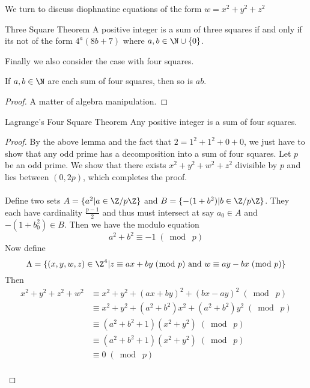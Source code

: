 We turn to discuss diophnatine equations of the form $w=x^2+y^2+z^2$

\begin{thm}{Three Square Theorem}{} A positive integer is a sum of three squares if and only if its not of the form $4^a(8b+7)$ where $a,b\in\N\cup\{0\}$. 
\end{thm}

Finally we also consider the case with four squares. 

\begin{lmm}{}{} If $a,b\in\N$ are each sum of four squares, then so is $ab$. \tcbline
\begin{proof}
A matter of algebra manipulation. 
\end{proof}
\end{lmm}

\begin{thm}{Lagrange's Four Square Theorem}{} Any positive integer is a sum of four squares. \tcbline
\begin{proof}
By the above lemma and the fact that $2=1^2+1^2+0+0$, we just have to show that any odd prime has a decomposition into a sum of four squares. Let $p$ be an odd prime. We show that there exists $x^2+y^2+w^2+z^2$ divisible by $p$ and lies between $(0,2p)$, which completes the proof. \\~\\
Define two sets $A=\{a^2|a\in\Z/p\Z\}$ and $B=\{-(1+b^2)|b\in\Z/p\Z\}$. They each have cardinality $\frac{p-1}{2}$ and thus must intersect at say $a_0\in A$ and $-(1+b_0^2)\in B$. Then we have the modulo equation $$a^2+b^2\equiv-1\;(\bmod\;p)$$ Now define $$\Lambda=\{(x,y,w,z)\in\Z^4|z\equiv ax+by\;(\bmod\;p)\text{ and }w\equiv ay-bx\;(\bmod\;p)\}$$ Then 
\begin{align*}
x^2+y^2+z^2+w^2&\equiv x^2+y^2+(ax+by)^2+(bx-ay)^2\;(\bmod\;p)\\
&\equiv x^2+y^2+(a^2+b^2)x^2+(a^2+b^2)y^2\;(\bmod\;p)\\
&\equiv(a^2+b^2+1)(x^2+y^2)\;(\bmod\;p)\\
&\equiv(a^2+b^2+1)(x^2+y^2)\;(\bmod\;p)\\
&\equiv 0\;(\bmod\;p)
\end{align*}~\\

\end{proof}
\end{thm}
